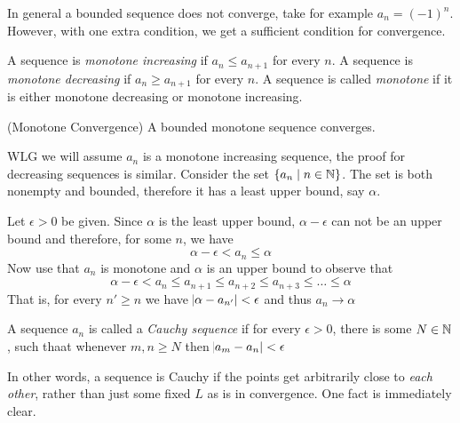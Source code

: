 In general a bounded sequence does not converge, take for example $a_n = (-1)^n$. However, with one extra condition, we get a sufficient condition for convergence.
\begin{SNP}{\dfn}{
	A sequence is \emph{monotone increasing} if $a_n \leq a_{n + 1}$ for every $n$. A sequence is \emph{monotone decreasing} if $a_n \geq a_{n + 1}$ for every $n$. A sequence is called \emph{monotone} if it is either monotone decreasing or monotone increasing.
}
\end{SNP}
\begin{SWP}{\thm}{(Monotone Convergence) A bounded monotone sequence converges.}{
	WLG we will assume $a_n$ is a monotone increasing sequence, the proof for decreasing sequences is similar. Consider the set $\{a_n \space \mid \space n \in \mathbb{N}\}$. The set is both nonempty and bounded, therefore it has a least upper bound, say $\alpha$.

	Let $\epsilon > 0$ be given. Since $\alpha$ is the least upper bound, $\alpha - \epsilon$ can not be an upper bound and therefore, for some $n$, we have
	$$
	\alpha - \epsilon < a_n \leq \alpha
	$$
	Now use that $a_n$ is monotone and $\alpha$ is an upper bound to observe that
	$$
	\alpha - \epsilon < a_n \leq a_{n + 1} \leq a_{n + 2} \leq a_{n + 3} \leq \dots \leq \alpha
	$$
	That is, for every $n' \geq n$ we have $\abs{\alpha - a_{n'}} < \epsilon$ and thus $a_n \rightarrow \alpha$
}
\end{SWP}
\begin{SNP}{\dfn}{
	A sequence $a_n$ is called a \emph{Cauchy sequence} if for every $\epsilon > 0$, there is some $N \in \mathbb{N}$, such thaat whenever $m, n \geq N$ then $\abs{a_m - a_n} < \epsilon$
}
\end{SNP}
In other words, a sequence is Cauchy if the points get arbitrarily close to \emph{each other}, rather than just some fixed $L$ as is in convergence. One fact is immediately clear.

